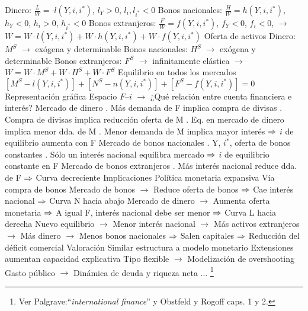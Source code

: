 \documentclass{nuevotema}
\begin{document}
\begin{esquemal}
				\4[] Dinero:
				\4[] $\frac{L}{W} = \cdot l(Y,i,i^*)$, $l_Y >0$, $l_i, l_{i^*} <0$
				\4[] Bonos nacionales:
				\4[] $\frac{H}{W} = h(Y,i,i^*)$, $h_Y < 0$, $h_i > 0$, $h_{i^*} <0$
				\4[] Bonos extranjeros:
				\4[] $\frac{F}{W} =  f(Y,i,i^*)$, $f_Y < 0$, $f_i < 0$,
				\4[] $\to$ $W = W \cdot l(Y,i,i^*) + W \cdot h(Y,i,i^*) + W \cdot f(Y,i,i^*)$
				\4 Oferta de activos
				\4[] Dinero: $M^S$ $\to$ exógena y determinable
				\4[] Bonos nacionales: $H^S$ $\to$ exógena y determinable
				\4[] Bonos extranjeros: $F^S$ $\to$ infinitamente elástica
				\4[] $\to$ $W = W \cdot M^S + W \cdot H^S + W \cdot F^S$
				\4 Equilibrio en todos los mercados
				\4[] $[M^S - l(Y,i,i^*)] + [N^S - n(Y,i,i^*)] + [F^S - f(Y,i,i^*)] = 0$
				\4 Representación gráfica
				\4[] Espacio $F$--$i$
				\4[] $\to$ ¿Qué relación entre cuenta financiera e interés?
				\4[] Mercado de dinero
				. Más demanda de F implica compra de divisas
				. Compra de divisas implica reducción oferta de M
				. Eq. en mercado de dinero implica menor dda. de M
				. Menor demanda de M implica mayor interés
				\4[] $\Rightarrow$ $i$ de equilibrio aumenta con F
				\4[] Mercado de bonos nacionales
				. Y, $i^*$, oferta de bonos constantes
				. Sólo un interés nacional equilibra mercado
				\4[] $\Rightarrow$ $i$ de equilibrio constante en F
				\4[] Mercado de bonos extranjeros
				. Más interés nacional reduce dda. de F
				\4[] $\Rightarrow$ Curva decreciente
				\4[] 
			\3 Implicaciones
				\4 Política monetaria expansiva
				\4[] Vía compra de bonos
				\4[] Mercado de bonos
				\4[] $\to$ Reduce oferta de bonos
				\4[] $\Rightarrow$ Cae interés nacional
				\4[] $\Rightarrow$ Curva N hacia abajo
				\4[] Mercado de dinero
				\4[] $\to$ Aumenta oferta monetaria
				\4[] $\Rightarrow$ A igual F, interés nacional debe ser menor
				\4[] $\Rightarrow$ Curva L hacia derecha
				\4[] Nuevo equilibrio
				\4[] $\to$ Menor interés nacional
				\4[] $\to$ Más activos extranjeros
				\4[] $\to$ Más dinero
				\4[] $\to$ Menos bonos nacionales
				\4[] $\Rightarrow$ Salen capitales
				\4[] $\Rightarrow$ Reducción del déficit comercial
				\4[] 
			\3 Valoración
				\4 Similar estructura a modelo monetario
				\4 Extensiones aumentan capacidad explicativa
				\4[] Tipo flexible
				\4[] $\to$ Modelización de overshooting
				\4[] Gasto público
				\4[] $\to$ Dinámica de deuda y riqueza neta
				\4[] ...
	\1 \footnote{Ver Palgrave:``\textit{international finance}'' y Obstfeld y Rogoff caps. 1 y 2.}

\end{esquemal}
\end{document}

